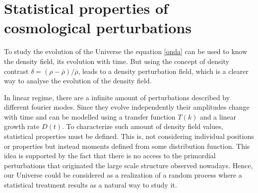 \section{ Statistical properties of cosmological perturbations }

To study the evolution of the Universe the equation \ref{onda} can be used to know 
the density field, its evolution with time. 
But using the concept of density contrast $\delta = (\rho - \overline{\rho})/\overline{\rho}$, 
leads to a density perturbation field, which is a clearer way to analyse the evolution
of the density field.

In linear regime, there are a infinite amount of perturbations described by different 
fourier modes. Since they evolve independently their amplitudes change with time and 
can be modelled using a transfer function $T(k)$ and a linear growth rate $D(t)$. 
To characterize such amount of density field values, statistical 
properties must be defined. 
This is, not considering individual positions or properties but instead moments defined from
some distribution function. This idea is supported by the fact that there is no access 
to the primordial perturbations that originated the large scale structure observed 
nowadays. Hence, our Universe could be considered as a realization of a random process 
where a statistical treatment results as a natural way to study it. 

